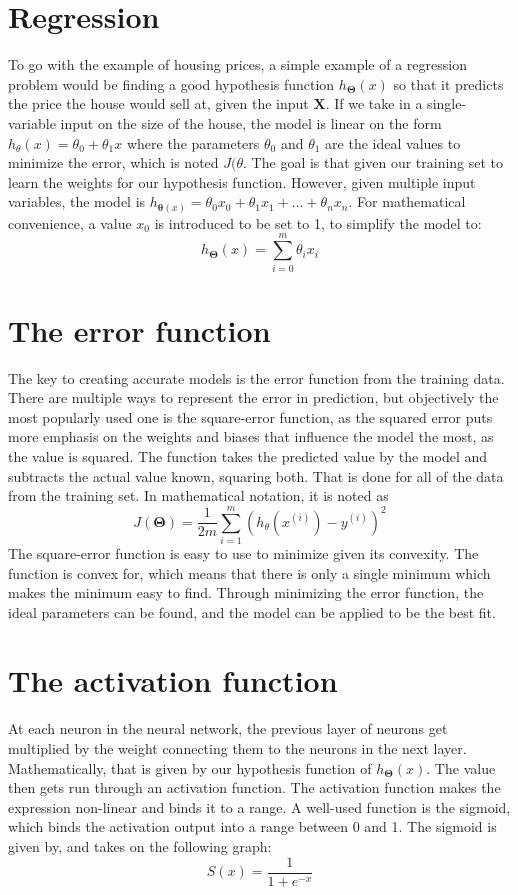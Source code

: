 \documentclass[a4paper,12pt]{article}
\begin{document}
\section{Regression}
To go with the example of housing prices, a simple example of a regression problem would be finding a good hypothesis function \(h_{\boldsymbol{\Theta}}(x)\) so that it predicts the price the house would sell at, given the input $\boldsymbol{X}$. If we take in a single-variable input on the size of the house, the model is linear on the form  \(h_\theta(x) = \theta_0 + \theta_1x\) where the parameters \(\theta_0\) and \(\theta_1\) are the ideal values to minimize the error, which is noted \(J(\theta\). The goal is that given our training set to learn the weights for our hypothesis function. However, given multiple input variables, the model is \(h_{\boldsymbol{\theta}(x)} = \theta_0x_0 + \theta_1x_1 + ... + \theta_nx_n\). For mathematical convenience, a value $x_0$ is introduced to be set to 1, to simplify the model to:
\[h_{\boldsymbol{\Theta}}(x) = \sum_{i = 0}^m \theta_ix_i\]

\section{The error function}
The key to creating accurate models is the error function from the training data. There are multiple ways to represent the error in prediction, but objectively the most popularly used one is the square-error function, as the squared error puts more emphasis on the weights and biases that influence the model the most, as the value is squared. The function takes the predicted value by the model and subtracts the actual value known, squaring both. That is done for all of the data from the training set. In mathematical notation, it is noted as
\[J(\boldsymbol{\Theta}) = \frac{1}{2m} \sum_{i=1}^m (h_\theta(x^{(i)}) - y^{(i)})^2\]
The square-error function is easy to use to minimize given its convexity. The function is convex for, which means that there is only a single minimum which makes the minimum easy to find. Through minimizing the error function, the ideal parameters can be found, and the model can be applied to be the best fit.

\section{The activation function}
At each neuron in the neural network, the previous layer of neurons get multiplied by the weight connecting them to the neurons in the next layer. Mathematically, that is given by our hypothesis function of $h_{\boldsymbol{\Theta}}(x)$. The value then gets run through an activation function. The activation function makes the expression non-linear and binds it to a range. A well-used function is the sigmoid, which binds the activation output into a range between 0 and 1. The sigmoid is given by, and takes on the following graph:
\[S(x) = \frac{1}{1+e^{-x}}\]
\end{document}
